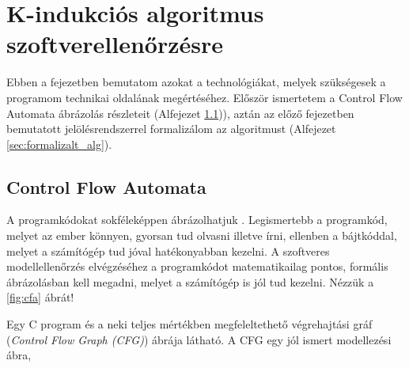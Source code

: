 \chapter{K-indukciós algoritmus szoftverellenőrzésre}

Ebben a fejezetben bemutatom azokat a technológiákat, melyek szükségesek a programom technikai oldalának megértéséhez. Először ismertetem a Control Flow Automata ábrázolás részleteit (Alfejezet \ref{sec:control_flow_automata})), aztán az előző fejezetben bemutatott jelölésrendszerrel formalizálom az algoritmust (Alfejezet \ref{sec:formalizalt_alg}).

\section{Control Flow Automata}
\label{sec:control_flow_automata}

A programkódokat sokféleképpen ábrázolhatjuk \cite{soft_ver_akos}. Legismertebb a programkód, melyet az ember könnyen, gyorsan tud olvasni illetve írni, ellenben a bájtkóddal, melyet a számítógép tud jóval hatékonyabban kezelni. A szoftveres modellellenőrzés elvégzéséhez a programkódot matematikailag pontos, formális ábrázolásban kell megadni, melyet a számítógép is jól tud kezelni. Nézzük a \ref{fig:cfa} ábrát!

Egy C program és a neki teljes mértékben megfeleltethető végrehajtási gráf (\emph{Control Flow Graph (CFG)}) ábrája látható. A CFG egy jól ismert modellezési ábra, 


